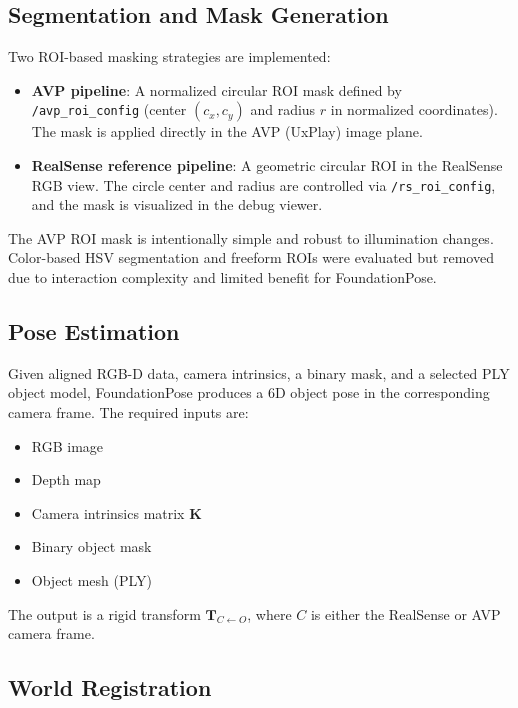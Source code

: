 \documentclass[11pt]{article}
\begin{document}
\subsection{Segmentation and Mask Generation}

Two ROI-based masking strategies are implemented:

\begin{itemize}
    \item \textbf{AVP pipeline}: A normalized circular ROI mask defined by \texttt{/avp\_roi\_config} (center $(c_x,c_y)$ and radius $r$ in normalized coordinates). The mask is applied directly in the AVP (UxPlay) image plane.
    \item \textbf{RealSense reference pipeline}: A geometric circular ROI in the RealSense RGB view. The circle center and radius are controlled via \texttt{/rs\_roi\_config}, and the mask is visualized in the debug viewer.
\end{itemize}

The AVP ROI mask is intentionally simple and robust to illumination changes. Color-based HSV segmentation and freeform ROIs were evaluated but removed due to interaction complexity and limited benefit for FoundationPose.

\subsection{Pose Estimation}

Given aligned RGB-D data, camera intrinsics, a binary mask, and a selected PLY object model, FoundationPose produces a $6$D object pose in the corresponding camera frame. The required inputs are:

\begin{itemize}
    \item RGB image
    \item Depth map
    \item Camera intrinsics matrix $\mathbf{K}$
    \item Binary object mask
    \item Object mesh (PLY)
\end{itemize}

The output is a rigid transform $\mathbf{T}_{C \leftarrow O}$, where $C$ is either the RealSense or AVP camera frame.

\subsection{World Registration}
\end{document}
